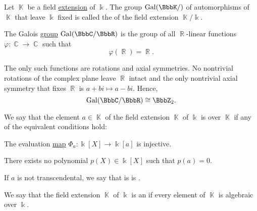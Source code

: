 \begin{definition}\label{def:galois_group}
  Let \( \BbbK \) be a field \hyperref[def:field_extension]{extension} of \( \Bbbk \). The group \( \op{Gal}(\BbbK / \Bbbk) \) of automorphisms of \( \BbbK \) that leave \( \Bbbk \) fixed is called the  of the field extension \( \BbbK / \Bbbk \).
\end{definition}

\begin{example}\label{thm:galois_group_complex_over_real}
  The Galois \hyperref[def:galois_group]{group} \( \op{Gal}(\BbbC / \BbbR) \) is the group of all \( \BbbR \)-linear functions \( \varphi: \BbbC \to \BbbC \) such that
  \begin{equation*}
    \varphi(\BbbR) = \BbbR.
  \end{equation*}

  The only such functions are rotations and axial symmetries. No nontrivial rotations of the complex plane leave \( \BbbR \) intact and the only nontrivial axial symmetry that fixes \( \BbbR \) is \( a + bi \mapsto a - bi \). Hence,
  \begin{equation*}
    \op{Gal}(\BbbC / \BbbR) \cong \BbbZ_2.
  \end{equation*}
\end{example}

\begin{definition}\label{def:transcendetal_element}
  We say that the element \( a \in \BbbK \) of the field extension \( \BbbK \) of \( \Bbbk \) is  over \( \BbbK \) if any of the equivalent conditions hold:
  \begin{thmenum}
     The evaluation \hyperref[thm:polynomial_ring_universal_property]{map} \( \Phi_a: \Bbbk[X] \to \Bbbk[a] \) is injective.

     There exists no polynomial \( p(X) \in \Bbbk[X] \) such that \( p(a) = 0 \).
  \end{thmenum}

  If \( a \) is not transcendental, we say that is is .
\end{definition}

\begin{definition}\label{def:algebraic_extension}
  We say that the field extension \( \BbbK \) of \( \Bbbk \) is an  if every element of \( \BbbK \) is algebraic over \( \Bbbk \).
\end{definition}

